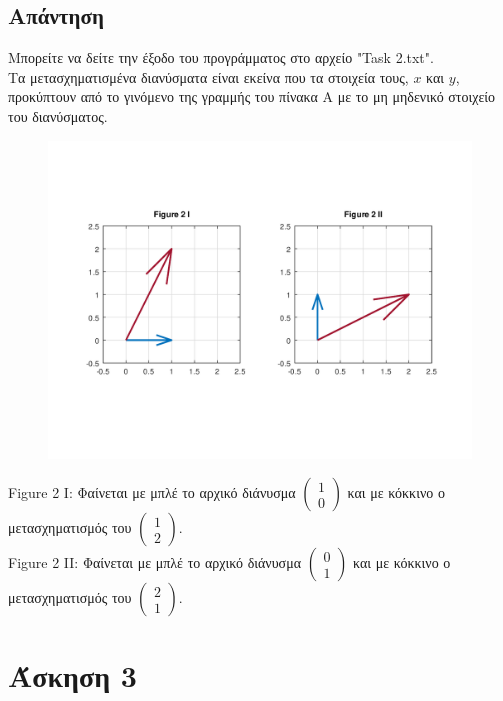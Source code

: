 \documentclass[a4paper,12pt]{article}
\begin{document}
\subsection{Απάντηση}
Μπορείτε να δείτε την έξοδο του προγράμματος στο αρχείο "Task 2.txt".\\
Τα μετασχηματισμένα διανύσματα είναι εκείνα που τα στοιχεία τους, $x$ και $y$,
προκύπτουν από το γινόμενο της γραμμής του πίνακα Α με το μη μηδενικό στοιχείο
του διανύσματος.
\begin{center}
	\begin{figure}[H]
		\centering
		\includegraphics[scale=0.8]{Task_2.png}
	\end{figure}
	Figure 2 I: Φαίνεται με μπλέ το αρχικό διάνυσμα $
		\begin{pmatrix}
			1 \\
			0
		\end{pmatrix}
	$ και με κόκκινο ο μετασχηματισμός του $
		\begin{pmatrix}
			1 \\
			2
		\end{pmatrix}
	$.\\
	Figure 2 II: Φαίνεται με μπλέ το αρχικό διάνυσμα $
		\begin{pmatrix}
			0 \\
			1
		\end{pmatrix}
	$ και με κόκκινο ο μετασχηματισμός του $
		\begin{pmatrix}
			2 \\
			1
		\end{pmatrix}
	$.
\end{center}
\newpage\section{Άσκηση 3}
\end{document}
